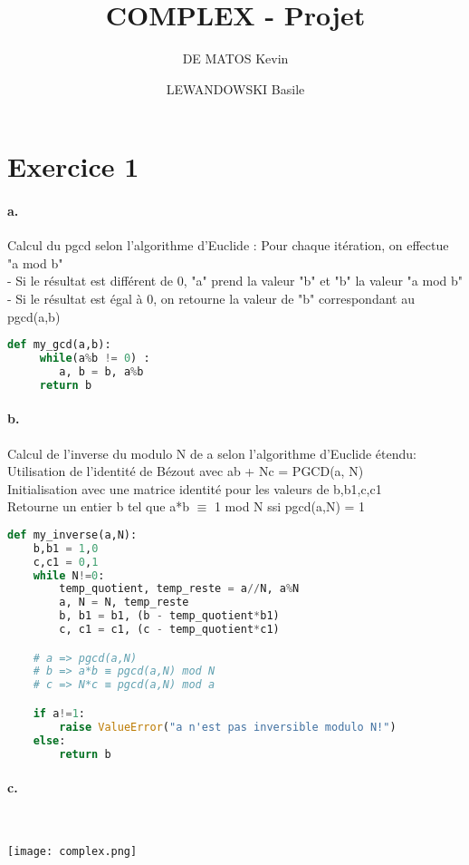 \documentclass[french]{article}
\author{
    DE MATOS Kevin\\
    \and
    LEWANDOWSKI Basile\\
}
\title{COMPLEX - Projet}
\begin{document}
\maketitle
\section*{Exercice 1}
\paragraph{a.} Calcul du pgcd selon l'algorithme d'Euclide :
Pour chaque itération, on effectue "a mod b"\\
 - Si le résultat est différent de 0, "a" prend la valeur "b" et "b" la valeur "a mod b"\\
 - Si le résultat est égal à 0, on retourne la valeur de "b" correspondant au pgcd(a,b)
 \begin{lstlisting}[language=Python, belowskip=-1 \baselineskip]
def my_gcd(a,b): 
     while(a%b != 0) : 
        a, b = b, a%b 
     return b
\end{lstlisting}
\paragraph{b.}Calcul de l’inverse du modulo N de a selon l'algorithme d’Euclide étendu:\\
Utilisation de l'identité de Bézout avec ab + Nc = PGCD(a, N)\\
Initialisation avec une matrice identité pour les valeurs de b,b1,c,c1\\
Retourne un entier b tel que a*b $\equiv$ 1 mod N ssi pgcd(a,N) = 1\\
\begin{lstlisting}[language=Python]
def my_inverse(a,N):
    b,b1 = 1,0
    c,c1 = 0,1
    while N!=0:
        temp_quotient, temp_reste = a//N, a%N 
        a, N = N, temp_reste
        b, b1 = b1, (b - temp_quotient*b1)
        c, c1 = c1, (c - temp_quotient*c1)

    # a => pgcd(a,N)
    # b => a*b ≡ pgcd(a,N) mod N
    # c => N*c ≡ pgcd(a,N) mod a

    if a!=1:
        raise ValueError("a n'est pas inversible modulo N!")
    else:
        return b
\end{lstlisting} 
\newpage 
\paragraph{c.} \*\\
\begin{center}
\texttt{[image: complex.png]}
\end{center}
\end{document}
